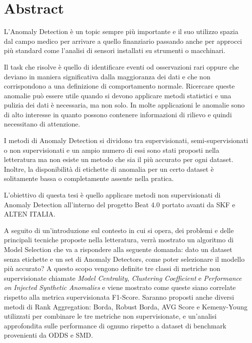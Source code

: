 \chapter*{Abstract}
L’Anomaly Detection è un topic sempre più importante e il suo utilizzo spazia dal campo medico per arrivare a quello finanziario passando anche per approcci più standard come l'analisi di sensori installati su strumenti o macchinari.

Il task che risolve è quello di identificare eventi od osservazioni rari oppure che deviano in maniera significativa dalla maggioranza dei dati e che non corrispondono a una definizione di comportamento normale. Ricercare queste anomalie può essere utile quando si devono applicare metodi statistici e una pulizia dei dati è necessaria, ma non solo. In molte applicazioni le anomalie sono di alto interesse in quanto possono contenere informazioni di rilievo e quindi necessitano di attenzione. 

I metodi di Anomaly Detection si dividono tra supervisionati, semi-supervisionati o non supervisionati e un ampio numero di essi sono stati proposti nella letteratura ma non esiste un metodo che sia il più accurato per ogni dataset. Inoltre, la disponibilità di etichette di anomalia per un certo dataset è solitamente bassa o completamente assente nella pratica. 


L’obiettivo di questa tesi è quello applicare metodi non supervisionati di Anomaly Detection all'interno del progetto Beat 4.0 portato avanti da SKF e ALTEN ITALIA. 

A seguito di un'introduzione sul contesto in cui si opera, dei problemi e delle principali tecniche proposte nella letteratura, verrà mostrato un algoritmo di Model Selection che va a rispondere alla seguente domanda: dato un dataset senza etichette e un set di Anomaly Detectors, come poter selezionare il modello più accurato? A questo scopo vengono definite tre classi di metriche non supervisionate chiamate \textit{Model Centrality}, \textit{Clustering Coefficient} e \textit{Performance on Injected Synthetic Anomalies} e viene mostrato come queste siano correlate rispetto alla metrica supervisionata F1-Score. Saranno proposti anche diversi metodi di Rank Aggregation: Borda, Robust Borda, AVG Score e Kemeny-Young utilizzati per combinare le tre metriche non supervisionate, e un'analisi approfondita sulle performance di ognuno rispetto a dataset di benchmark provenienti da ODDS e SMD.

